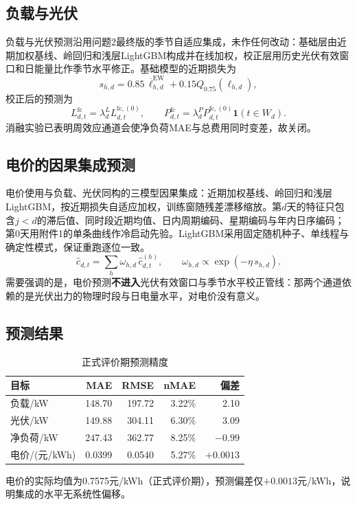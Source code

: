 \documentclass[UTF8,12pt]{ctexart}
\begin{document}
\subsection{负载与光伏}
负载与光伏预测沿用问题2最终版的季节自适应集成，未作任何改动：基础层由近期加权基线、岭回归和浅层LightGBM构成并在线加权，校正层用历史光伏有效窗口和日能量比作季节水平修正。基础模型的近期损失为
\[
s_{h,d}=0.85\,\overline \ell_{h,d}^{\mathrm{EW}}+0.15Q_{0.75}(\ell_{h,d}),
\]
校正后的预测为
\[
L_{d,t}^{\mathrm{fc}}=\lambda^{L}_dL_{d,t}^{\mathrm{fc},(0)},\qquad
P_{d,t}^{\mathrm{fc}}=\lambda^{P}_dP_{d,t}^{\mathrm{fc},(0)}\mathbf 1(t\in W_d).
\]
消融实验已表明周效应通道会使净负荷MAE与总费用同时变差，故关闭。

\subsection{电价的因果集成预测}
电价使用与负载、光伏同构的三模型因果集成：近期加权基线、岭回归和浅层LightGBM，按近期损失自适应加权，训练窗随残差漂移缩放。第$d$天的特征只包含$j<d$的滞后值、同时段近期均值、日内周期编码、星期编码与年内日序编码；第0天用附件1的单条曲线作冷启动先验。LightGBM采用固定随机种子、单线程与确定性模式，保证重跑逐位一致。
\[
\hat c_{d,t}=\sum_{h}\omega_{h,d}\,\hat c^{(h)}_{d,t},\qquad
\omega_{h,d}\propto \exp(-\eta\, s_{h,d}).
\]
需要强调的是，电价预测\textbf{不进入}光伏有效窗口与季节水平校正管线：那两个通道依赖的是光伏出力的物理时段与日电量水平，对电价没有意义。

\subsection{预测结果}
\begin{table}[H]\centering
\caption{正式评价期预测精度}
\begin{tabular}{lrrrr}\toprule
目标 & MAE & RMSE & nMAE & 偏差\\\midrule
负载/kW & 148.70 & 197.72 & 3.22\% & 2.10\\
光伏/kW & 149.88 & 304.11 & 6.30\% & 3.09\\
净负荷/kW & 247.43 & 362.77 & 8.25\% & $-0.99$\\
电价/(元/kWh) & 0.0399 & 0.0540 & 5.27\% & $+0.0013$\\\bottomrule
\end{tabular}
\end{table}

电价的实际均值为0.7575元/kWh（正式评价期），预测偏差仅$+0.0013$元/kWh，说明集成的水平无系统性偏移。
\end{document}
